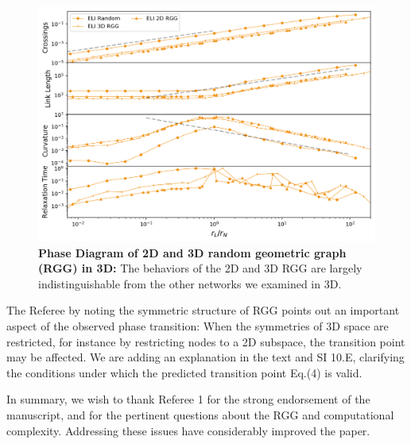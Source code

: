 \documentclass[11pt]{article}
\begin{document}
\begin{response}
\begin{figure}
    \centering
    \includegraphics[width=.8\textwidth]{fig-09-19/phase-RGG-rand-042018.png}
    \caption{\scriptsize {\bf Phase Diagram of 2D and 3D random geometric graph (RGG) in 3D:} 
    The behaviors of the 2D and 3D RGG are largely indistinguishable from the other networks we examined in 3D. 
    }
    \label{fig:RGG}
\end{figure}


The Referee by noting the symmetric structure of RGG points out an important aspect of the observed phase transition: 
When the symmetries of 3D space are restricted, for instance by restricting nodes to a 2D subspace, the transition point may be affected. 
We are adding an explanation in the text and SI 10.E, clarifying the conditions under which the predicted transition point Eq.(4) is valid.

In summary, we wish to thank Referee 1 for the strong endorsement of the manuscript, and for the pertinent questions about the RGG and computational complexity. 
Addressing these issues have considerably improved the paper. 



\end{response}
\end{document}
